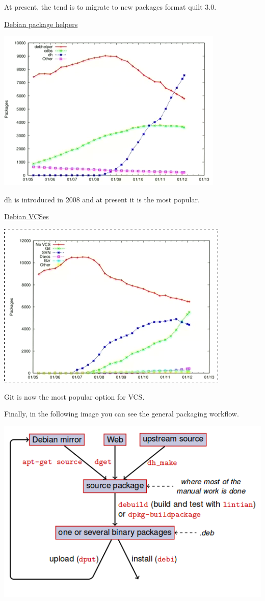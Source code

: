 \documentclass[11pt]{article}
\begin{document}
At present, the tend is to migrate to new packages format quilt 3.0.

\underline{Debian package helpers}

\includegraphics[scale=0.7]{img/packagesHelpers}

dh is introduced in 2008 and at present it is the most popular.

\underline{Debian VCSes}

\includegraphics[scale=0.7]{img/VCSes}

Git is now the most popular option for VCS.

Finally, in the following image you can see the general packaging workflow.

\hfill\includegraphics[scale=0.5]{img/generalPackagingWorkflow}\hspace*{\fill}
\end{document}
